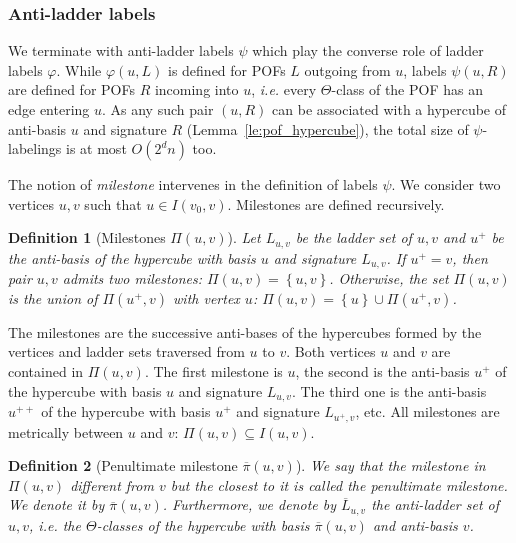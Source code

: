 \documentclass{article}
\newtheorem{definition}{Definition}
\newcommand{\set}[1]{\left\{ #1 \right\}}
\begin{document}
\subsubsection{Anti-ladder labels} \label{subsubsec:anti_ladder}

We terminate with anti-ladder labels $\psi$ which play the converse role of ladder labels $\varphi$. While $\varphi(u,L)$ is defined for POFs $L$ outgoing from $u$, labels $\psi(u,R)$ are defined for POFs $R$ incoming into $u$, {\em i.e.} every $\Theta$-class of the POF has an edge entering $u$. As any such pair $(u,R)$ can be associated with a hypercube of anti-basis $u$ and signature $R$ (Lemma~\ref{le:pof_hypercube}), the total size of $\psi$-labelings is at most $O(2^dn)$ too.

The notion of \textit{milestone} intervenes in the definition of labels $\psi$. We consider two vertices $u,v$ such that $u \in I(v_0,v)$. Milestones are defined recursively.

\begin{definition}[Milestones $\Pi(u,v)$]
Let $L_{u,v}$ be the ladder set of $u,v$ and $u^+$ be the anti-basis of the hypercube with basis $u$ and signature $L_{u,v}$.
If $u^+ = v$, then pair $u,v$ admits two milestones: $\Pi(u,v) = \set{u,v}$. Otherwise, the set $\Pi(u,v)$ is the union of $\Pi(u^+,v)$ with vertex $u$: $\Pi(u,v) = \set{u} \cup \Pi(u^+,v)$.
\label{def:milestones}
\end{definition}

The milestones are the successive anti-bases of the hypercubes formed by the vertices and ladder sets traversed from $u$ to $v$. Both vertices $u$ and $v$ are contained in $\Pi(u,v)$. The first milestone is $u$, the second is the anti-basis $u^+$ of the hypercube with basis $u$ and signature $L_{u,v}$. The third one is the anti-basis $u^{++}$ of the hypercube with basis $u^+$ and signature $L_{u^+,v}$, etc. All milestones are metrically between $u$ and $v$: $\Pi(u,v) \subseteq I(u,v)$. 

\begin{definition}[Penultimate milestone $\overline{\pi}(u,v)$]
We say that the milestone in $\Pi(u,v)$ different from $v$ but the closest to it is called the \textit{penultimate milestone}. We denote it by $\overline{\pi}(u,v)$. Furthermore, we denote by $\overline{L}_{u,v}$ the \emph{anti-ladder set} of $u,v$, {\em i.e.} the $\Theta$-classes of the hypercube with basis $\overline{\pi}(u,v)$ and anti-basis $v$. 
\end{definition}
\end{document}

